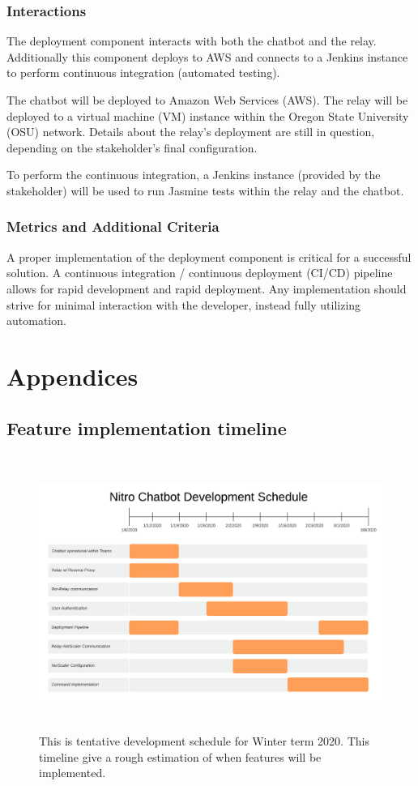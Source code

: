\documentclass[onecolumn, draftclsnofoot,10pt, compsoc]{IEEEtran}
\begin{document}
\subsubsection{Interactions}
The deployment component interacts with both the chatbot and the relay.
Additionally this component deploys to AWS and connects to a Jenkins instance to perform continuous integration (automated testing).

The chatbot will be deployed to Amazon Web Services (AWS).
The relay will be deployed to a virtual machine (VM) instance within the Oregon State University (OSU) network.
Details about the relay's deployment are still in question, depending on the stakeholder's final configuration.

To perform the continuous integration, a Jenkins instance (provided by the stakeholder) will be used to run Jasmine tests within the relay and the chatbot. 

\subsubsection{Metrics and Additional Criteria}
A proper implementation of the deployment component is critical for a successful solution.
A continuous integration / continuous deployment (CI/CD) pipeline allows for rapid development and rapid deployment.
Any implementation should strive for minimal interaction with the developer, instead fully utilizing automation.

\clearpage
\section{Appendices}
\subsection{Feature implementation timeline}
\begin{figure}[h]
    \centering
    \captionsetup{format=hang,justification=raggedright,margin=2cm}
    \includegraphics[height=9cm]{gantt.png}
    \caption[Feature implementation timeline]{This is tentative development schedule for Winter term 2020. This timeline give a rough estimation of when features will be implemented.}
    \label{fig:Feature implementation Timeline}
\end{figure}

\clearpage


\end{document}
